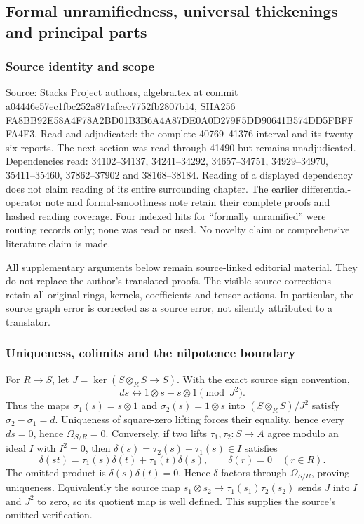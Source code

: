 \subsection{Formal unramifiedness, universal thickenings and principal parts}\label{formal-unramifiedness-universal-thickenings-and-principal-parts}

\subsubsection{Source identity and scope}\label{source-identity-and-scope}

Source: Stacks Project authors, algebra.tex at commit a04446e57ec1fbc252a871afcec7752fb2807b14, SHA256 FA8BB92E58A4F78A2BD01B3B6A4A87DE0A0D279F5DD90641B574DD5FBFFFA4F3. Read and adjudicated: the complete 40769--41376 interval and its twenty-six reports. The next section was read through 41490 but remains unadjudicated. Dependencies read: 34102--34137, 34241--34292, 34657--34751, 34929--34970, 35411--35460, 37862--37902 and 38168--38184. Reading of a displayed dependency does not claim reading of its entire surrounding chapter. The earlier differential-operator note and formal-smoothness note retain their complete proofs and hashed reading coverage. Four indexed hits for ``formally unramified'' were routing records only; none was read or used. No novelty claim or comprehensive literature claim is made.

All supplementary arguments below remain source-linked editorial material. They do not replace the author's translated proofs. The visible source corrections retain all original rings, kernels, coefficients and tensor actions. In particular, the source graph error is corrected as a source error, not silently attributed to a translator.

\subsubsection{Uniqueness, colimits and the nilpotence boundary}\label{uniqueness-colimits-and-the-nilpotence-boundary}

For \(R\to S\), let \(J=\ker(S\otimes_R S\to S)\). With the exact source sign convention, \[
ds\longleftrightarrow 1\otimes s-s\otimes1\pmod {J^2}.
\] Thus the maps \(\sigma_1(s)=s\otimes1\) and \(\sigma_2(s)=1\otimes s\) into \((S\otimes_R S)/J^2\) satisfy \(\sigma_2-\sigma_1=d\). Uniqueness of square-zero lifting forces their equality, hence every \(ds=0\), hence \(\Omega_{S/R}=0\). Conversely, if two lifts \(\tau_1,\tau_2:S\to A\) agree modulo an ideal \(I\) with \(I^2=0\), then \(\delta(s)=\tau_2(s)-\tau_1(s)\in I\) satisfies \[
\delta(st)=\tau_1(s)\delta(t)+\tau_1(t)\delta(s),
\qquad \delta(r)=0\quad(r\in R).
\] The omitted product is \(\delta(s)\delta(t)=0\). Hence \(\delta\) factors through \(\Omega_{S/R}\), proving uniqueness. Equivalently the source map \(s_1\otimes s_2\mapsto\tau_1(s_1)\tau_2(s_2)\) sends \(J\) into \(I\) and \(J^2\) to zero, so its quotient map is well defined. This supplies the source's omitted verification.

